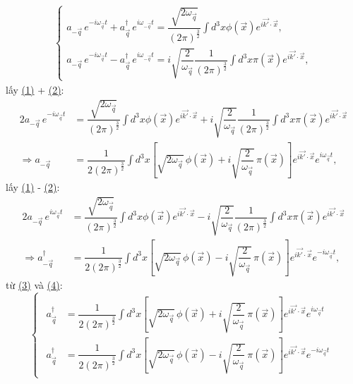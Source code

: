 \documentclass{report}
\begin{document}
\begin{align*}
	\begin{cases}
		 a_{-\vec{q}}\,e^{-i\omega_{\vec{q}}t} + a_{\vec{q}}^{\dagger}\,e^{i\omega_{-\vec{q}}t} = \dfrac{\sqrt{2\omega_{\vec{q}}}}{(2\pi)^{\frac{3}{2}}} \displaystyle \int d^3x \phi(\vec{x}) e^{i\vec{k'}\cdot\vec{x}},\\
	a_{-\vec{q}}\,e^{-i\omega_{\vec{q}}t} - a_{\vec{q}}^{\dagger}\,e^{i\omega_{-\vec{q}}t}  = i\sqrt{\dfrac{2}{\omega_{\vec{q}}}}\dfrac{1}{(2\pi)^\frac{3}{2}} \displaystyle\int d^3x \pi(\vec{x}) e^{i\vec{k'}\cdot\vec{x}},
	\end{cases}
\end{align*}
lấy \hyperref[eq1]{(1)} + \hyperref[eq2]{(2)}:
\begin{align}
	 2 a_{-\vec{q}}\,e^{-i\omega_{\vec{q}}t} 
	 &= \dfrac{\sqrt{2\omega_{\vec{q}}}}{(2\pi)^{\frac{3}{2}}} \displaystyle \int d^3x \phi(\vec{x}) e^{i\vec{k'}\cdot\vec{x}} + i\sqrt{\dfrac{2}{\omega_{\vec{q}}}}\dfrac{1}{(2\pi)^\frac{3}{2}} \displaystyle\int d^3x \pi(\vec{x}) e^{i\vec{k'}\cdot\vec{x}} \nonumber \\
	 \Rightarrow  a_{-\vec{q}} &= \dfrac{1}{2(2\pi)^\frac{3}{2}}  \displaystyle \int d^3x \left[\sqrt{2\omega_{\vec{q}}}\,\phi(\vec{x}) + i\sqrt{\dfrac{2}{\omega_{\vec{q}}}}\,\pi(\vec{x})\right] e^{i\vec{k'}\cdot\vec{x}} e^{i\omega_{\vec{q}}t}, \label{eq3} 
\end{align}
lấy \hyperref[eq1]{(1)} - \hyperref[eq2]{(2)}:
\begin{align}
	2 a_{-\vec{q}}\,e^{i\omega_{\vec{q}}t} 
	&= \dfrac{\sqrt{2\omega_{\vec{q}}}}{(2\pi)^{\frac{3}{2}}} \displaystyle \int d^3x \phi(\vec{x}) e^{i\vec{k'}\cdot\vec{x}} - i\sqrt{\dfrac{2}{\omega_{\vec{q}}}}\dfrac{1}{(2\pi)^\frac{3}{2}} \displaystyle\int d^3x \pi(\vec{x}) e^{i\vec{k'}\cdot\vec{x}} \nonumber \\
	\Rightarrow  a_{-\vec{q}}^{\dagger} &= \dfrac{1}{2(2\pi)^\frac{3}{2} }  \displaystyle \int d^3x \left[\sqrt{2\omega_{\vec{q}}}\,\phi(\vec{x}) - i\sqrt{\dfrac{2}{\omega_{\vec{q}}}}\,\pi(\vec{x})\right] e^{i\vec{k'}\cdot\vec{x}} e^{-i\omega_{\vec{q}}t}, \label{eq4} 
\end{align}
từ \hyperref[eq3]{(3)} và \hyperref[eq4]{(4)}:
\begin{equation}
	\begin{cases}
		\begin{aligned}
			a_{\vec{q}}^{\dagger} &= \dfrac{1}{2(2\pi)^\frac{3}{2} }  \displaystyle \int d^3x \left[\sqrt{2\omega_{\vec{q}}}\,\phi(\vec{x}) + i\sqrt{\dfrac{2}{\omega_{\vec{q}}}}\,\pi(\vec{x})\right] e^{i\vec{k'}\cdot\vec{x}} e^{i\omega_{\vec{q}}t}\\
			a_{\vec{q}}^{\dagger} &= \dfrac{1}{2(2\pi)^\frac{3}{2} }  \displaystyle \int d^3x \left[\sqrt{2\omega_{\vec{q}}}\,\phi(\vec{x}) - i\sqrt{\dfrac{2}{\omega_{\vec{q}}}}\,\pi(\vec{x})\right] e^{i\vec{k'}\cdot\vec{x}} e^{-i\omega_{\vec{q}}t}
		\end{aligned}
	\end{cases}\nonumber
\end{equation}
\end{document}
